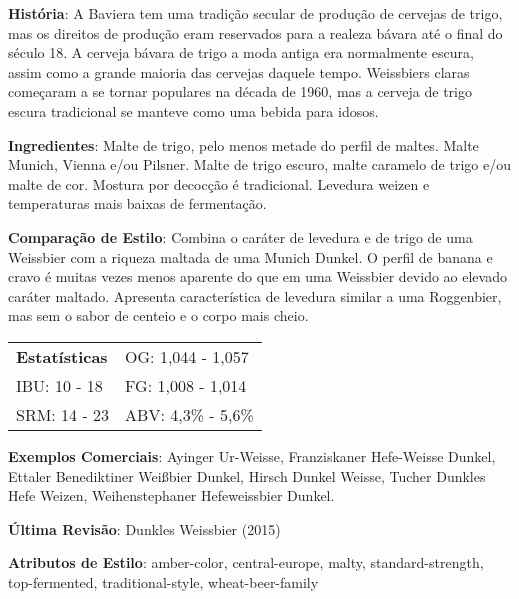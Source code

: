 \textbf{História}: A Baviera tem uma tradição secular de produção de cervejas de trigo, mas os direitos de produção eram reservados para a realeza bávara até o final do século 18. A cerveja bávara de trigo a moda antiga era normalmente escura, assim como a grande maioria das cervejas daquele tempo. Weissbiers claras começaram a se tornar populares na década de 1960, mas a cerveja de trigo escura tradicional se manteve como uma bebida para idosos.

\textbf{Ingredientes}: Malte de trigo, pelo menos metade do perfil de maltes. Malte Munich, Vienna e/ou Pilsner. Malte de trigo escuro, malte caramelo de trigo e/ou malte de cor. Mostura por decocção é tradicional. Levedura weizen e temperaturas mais baixas de fermentação.

\textbf{Comparação de Estilo}: Combina o caráter de levedura e de trigo de uma Weissbier com a riqueza maltada de uma Munich Dunkel. O perfil de banana e cravo é muitas vezes menos aparente do que em uma Weissbier devido ao elevado caráter maltado. Apresenta característica de levedura similar a uma Roggenbier, mas sem o sabor de centeio e o corpo mais cheio.

\begin{tabular}{@{}p{35mm}p{35mm}@{}}
  \textbf{Estatísticas} & OG: 1,044 - 1,057 \\
  IBU: 10 - 18 & FG: 1,008 - 1,014 \\
  SRM: 14 - 23 & ABV: 4,3\% - 5,6\%
\end{tabular}

\textbf{Exemplos Comerciais}: Ayinger Ur-Weisse, Franziskaner Hefe-Weisse Dunkel, Ettaler Benediktiner Weißbier Dunkel, Hirsch Dunkel Weisse, Tucher Dunkles Hefe Weizen, Weihenstephaner Hefeweissbier Dunkel.

\textbf{Última Revisão}: Dunkles Weissbier (2015)

\textbf{Atributos de Estilo}: amber-color, central-europe, malty, standard-strength, top-fermented, traditional-style, wheat-beer-family
